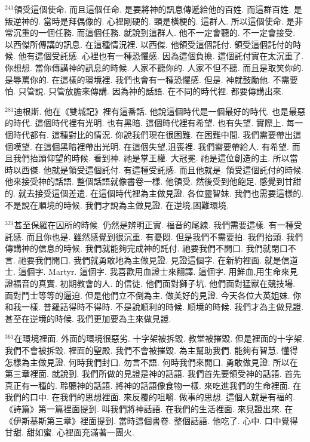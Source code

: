 \documentclass{book}
\begin{document}
$^{241}$領受這個使命.
而且這個任命.
是要將神的訊息傳遞給他的百姓.
而這群百姓.
是叛逆神的.
當時是拜偶像的.
心裡剛硬的.
頸是橫梗的.
這群人.
所以這個使命.
是非常沉重的一個任務.
而這個任務.
就說到這群人.
他不一定會聽的.
不一定會接受.
以西傑所傳講的訊息.
在這種情況裡.
以西傑.
他領受這個託付.
領受這個託付的時候.
他有這個受託感.
心裡也有一種恐懼感.
因為這個負擔.
這個託付實在太沉重了.
你想想.
當你傳講神的訊息的時候.
人家不聽你的.
人家不但不聽.
而且是取笑你的.
是辱罵你的.
在這樣的環境裡.
我們也會有一種恐懼感.
但是.
神就鼓勵他.
不需要怕.
只管說.
只管放膽來傳講.
因為神的話語.
在不同的時代裡.
都要傳講出來.

$^{281}$迪根斯.
他在《雙城記》裡有這番話.
他說這個時代是一個最好的時代.
也是最惡的時代.
這個時代裡有光明.
也有黑暗.
這個時代裡有希望.
也有失望.
實際上.
每一個時代都有.
這種對比的情況.
你說我們現在很困難.
在困難中間.
我們需要帶出這個嘆望.
在這個黑暗裡帶出光明.
在這個失望,沮喪裡.
我們需要帶給人.
有希望.
而且我們抬頭仰望的時候.
看到神.
祂是掌王權.
大冠冕.
祂是這位創造的主.
所以當時以西傑.
他就是領受這個託付.
有這種受託感.
而且他就是.
領受這個託付的時候.
他來接受神的話語.
整個話語就像書卷一樣.
他領受.
然後受到他飽足.
感覺到甘甜的.
就去接受這個差遣.
在這個時代裡為主做見證.
各位靈智妹.
我們也需要這樣的.
不是說在順境的時候.
我們才說為主做見證.
在逆境,困難環境.

$^{321}$甚至保羅在囚所的時候.
仍然是辨明正實.
福音的尾線.
我們需要這樣.
有一種受託感.
而且你也是.
雖然感覺到很沉重.
有憂悶.
但是我們不需要拍.
我們抬頭.
我們傳講神的信息的時候.
我們就能夠完成神的託付.
祂要我們不開口.
我們就閉口不言.
祂要我們開口.
我們就勇敢地為主做見證.
見證這個字.
在新約裡面.
就是信道士.
這個字.
Martyr.
這個字.
我喜歡用血證士來翻譯.
這個字.
用鮮血,用生命來見證福音的真實.
初期教會的人.
的信徒.
他們面對獅子坑.
他們面對猛獸在競技場.
面對鬥士等等的逼迫.
但是他們立不倒為主.
做美好的見證.
今天各位大英姐妹.
你和我一樣.
普羅話得時不得時.
不是說順利的時候.
順境的時候.
我們才為主做見證.
甚至在逆境的時候.
我們更加要為主來做見證.

$^{361}$在環境裡面.
外面的環境很惡劣.
十字架被拆毀.
教堂被摧毀.
但是裡面的十字架.
我們不會被拆毀.
裡面的聖殿.
我們不會被摧毀.
為主幫助我們.
能夠有智慧.
懂得怎樣為主做見證.
何時我們封口.
勿言不語.
何時我們來開口.
勇敢做見證.
所以在第三章裡面.
就說到.
我們所做的見證是神的話語.
我們首先要領受神的話語.
首先真正有一種的.
聆聽神的話語.
將神的話語像食物一樣.
來吃進我們的生命裡面.
在我們的口中.
在我們的思想裡面.
來反覆的咀嚼.
做事的思想.
這個人就是有福的.
《詩篇》第一篇裡面提到.
叫我們將神話語.
在我們的生活裡面.
來見證出來.
在《伊斯基斯第三章》裡面提到.
當時這個書卷.
整個話語.
他吃了.
心中.
口中覺得甘甜.
甜如蜜.
心裡面充滿著一團火.
\end{document}
